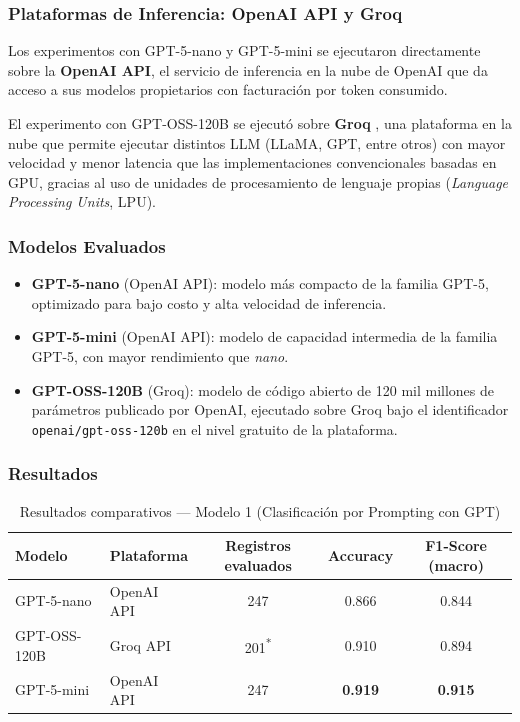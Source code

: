 \documentclass[11pt,a4paper]{article}
\begin{document}
\subsubsection{Plataformas de Inferencia: OpenAI API y Groq}
\label{sec:modelo1-plataformas}

Los experimentos con GPT-5-nano y GPT-5-mini se ejecutaron directamente sobre la \textbf{OpenAI API}, el servicio de inferencia en la nube de OpenAI que da acceso a sus modelos propietarios con facturación por token consumido.

El experimento con GPT-OSS-120B se ejecutó sobre \textbf{Groq} \cite{groq2024}, una plataforma en la nube que permite ejecutar distintos LLM (LLaMA, GPT, entre otros) con mayor velocidad y menor latencia que las implementaciones convencionales basadas en GPU, gracias al uso de unidades de procesamiento de lenguaje propias (\emph{Language Processing Units}, LPU).

\subsubsection{Modelos Evaluados}

\begin{itemize}
    \item \textbf{GPT-5-nano} (OpenAI API): modelo más compacto de la familia GPT-5, optimizado para bajo costo y alta velocidad de inferencia.
    \item \textbf{GPT-5-mini} (OpenAI API): modelo de capacidad intermedia de la familia GPT-5, con mayor rendimiento que \textit{nano}.
    \item \textbf{GPT-OSS-120B} (Groq): modelo de código abierto de 120 mil millones de parámetros publicado por OpenAI, ejecutado sobre Groq bajo el identificador \texttt{openai/gpt-oss-120b} \cite{groq-gptoss2024} en el nivel gratuito de la plataforma.
\end{itemize}

\subsubsection{Resultados}

\begin{table}[H]
\centering
\caption{Resultados comparativos --- Modelo 1 (Clasificación por Prompting con GPT)}
\small
\begin{tabular}{llccc}
\toprule
Modelo & Plataforma & Registros evaluados & Accuracy & F1-Score (macro) \\
\midrule
GPT-5-nano   & OpenAI API & 247                          & 0.866          & 0.844 \\
GPT-OSS-120B & Groq API   & 201\textsuperscript{*}       & 0.910          & 0.894 \\
GPT-5-mini   & OpenAI API & 247                          & \textbf{0.919} & \textbf{0.915} \\
\bottomrule
\end{tabular}
\label{tab:modelo1-resultados}
\end{table}
\end{document}
